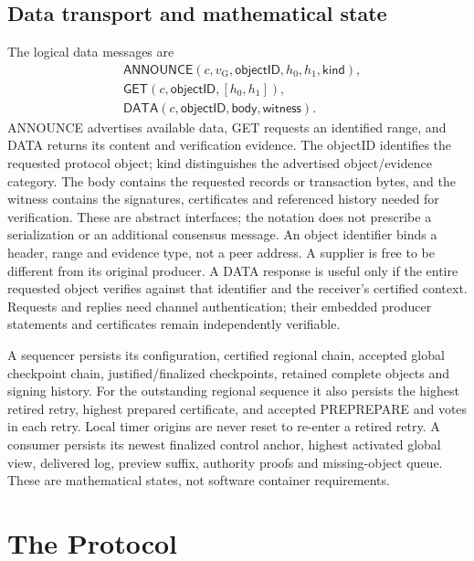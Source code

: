\documentclass[11pt,a4paper,onecolumn]{article}
\newcommand{\gv}{v_{\mathrm G}}
\newcommand{\Tag}[1]{\mathsf{#1}}
\theoremstyle{remark}\newtheorem{example}[definition]{Example}
\newcounter{protocol}
\begin{document}
\subsection{Data transport and mathematical state}\label{sec:transport}
The logical data messages are
\begin{align*}
 &\Tag{ANNOUNCE}(c,\gv,\mathsf{objectID},h_0,h_1,\mathsf{kind}),\\
 &\Tag{GET}(c,\mathsf{objectID},[h_0,h_1]),\\
 &\Tag{DATA}(c,\mathsf{objectID},\mathsf{body},\mathsf{witness}).
\end{align*}
ANNOUNCE advertises available data, GET requests an identified range, and DATA
returns its content and verification evidence. The objectID identifies the
requested protocol object; kind distinguishes the advertised object/evidence
category. The body contains the requested records or transaction bytes, and
the witness contains the signatures, certificates and referenced history
needed for verification. These are abstract interfaces; the notation does not
prescribe a serialization or an additional consensus message.
An object identifier binds a header, range and evidence type, not a peer address.
A supplier is free to be different from its original producer. A DATA response
is useful only if the entire requested object verifies against that identifier
and the receiver's certified context. Requests and replies need channel
authentication; their embedded producer statements and certificates remain
independently verifiable.


A sequencer persists its configuration, certified regional chain, accepted
global checkpoint chain, justified/finalized checkpoints, retained complete
objects and signing history. For the outstanding regional sequence it also
persists the highest retired retry, highest prepared certificate, and accepted
PREPREPARE and votes in each retry. Local timer origins are never reset to
re-enter a retired retry. A consumer persists its newest finalized control
anchor, highest activated global view, delivered log, preview suffix, authority
proofs and missing-object queue. These are mathematical states, not software
container requirements.

\section{The Protocol}\label{sec:protocol}
\end{document}
